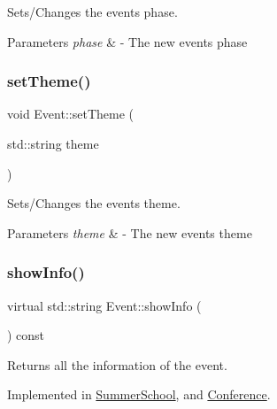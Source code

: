 Sets/\+Changes the event\textquotesingle{}s phase. 


\begin{DoxyParams}{Parameters}
{\em phase} & -\/ The new event\textquotesingle{}s phase \\
\hline
\end{DoxyParams}
\mbox{\label{classEvent_abdd2c869f0231002c2a16813923586fb}} 
\subsubsection{\texorpdfstring{set\+Theme()}{setTheme()}}
{\footnotesize\ttfamily void Event\+::set\+Theme (\begin{DoxyParamCaption}\item[{std\+::string}]{theme }\end{DoxyParamCaption})}



Sets/\+Changes the event\textquotesingle{}s theme. 


\begin{DoxyParams}{Parameters}
{\em theme} & -\/ The new event\textquotesingle{}s theme \\
\hline
\end{DoxyParams}
\mbox{\label{classEvent_aaa38f467e933c57190d43351bdb817be}} 
\subsubsection{\texorpdfstring{show\+Info()}{showInfo()}}
{\footnotesize\ttfamily virtual std\+::string Event\+::show\+Info (\begin{DoxyParamCaption}{ }\end{DoxyParamCaption}) const\hspace{0.3cm}{\ttfamily [pure virtual]}}



Returns all the information of the event. 



Implemented in \mbox{\hyperlink{classSummerSchool_a61ac7307840f787e3de639d431248e26}{Summer\+School}}, and \mbox{\hyperlink{classConference_a7a2f7b38c728f487d82356d3c671ef88}{Conference}}.



